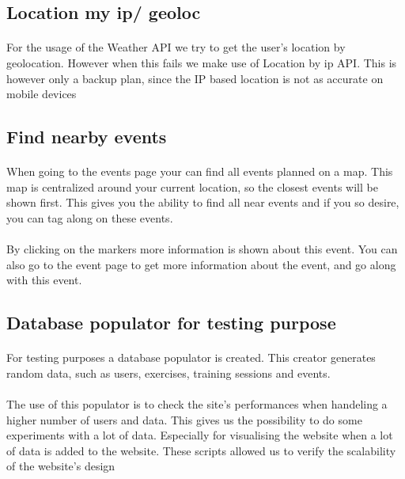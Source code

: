 \documentclass[11pt,a4paper]{scrartcl}
\begin{document}
\subsection{Location my ip/ geoloc}
\paragraph{}For the usage of the Weather API we try to get the user's location by geolocation. However when this fails we make use of Location by ip API. This is however only a backup plan, since the IP based location is not as accurate on mobile devices
\subsection{Find nearby events}
\paragraph{}When going to the events page your can find all events planned on a map. This map is centralized around your current location, so the closest events will be shown first. This gives you the ability to find all near events and if you so desire, you can tag along on these events.
\paragraph{}By clicking on the markers more information is shown about this event. You can also go to the event page to get more information about the event, and go along with this event.
\subsection{Database populator for testing purpose}
\paragraph{}For testing purposes a database populator is created. This creator generates random data, such as users, exercises, training sessions and events.
\paragraph{}The use of this populator is to check the site's performances when handeling a higher number of users and data. This gives us the possibility to do some experiments with a lot of data. Especially for visualising the website when a lot of data is added to the website. These scripts allowed us to verify the scalability of the website's design
\end{document}

